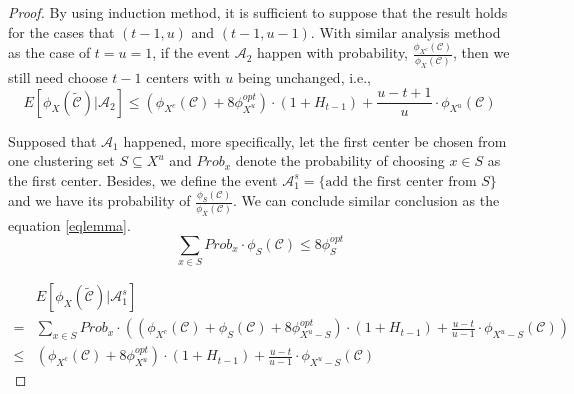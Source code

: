 \begin{lemma}
\begin{proof}
          
         By using induction method, it is sufficient to suppose that the result holds for the cases that $(t-1, u)$ and $(t-1, u-1)$. With similar analysis method as the case of $t = u =1$, if the event $\mathscr{A}_{2}$ happen with probability, $\frac{\phi_{X^{c}}(\mathcal{C})}{\phi_{X}(\mathcal{C})}$, then we still need choose $t-1$ centers with $u$ being unchanged, i.e., 
         \begin{equation}
         E[\phi_{X}(\tilde{\mathcal{C}})|\mathscr{A}_{2}] \leq \left(\phi_{X^{c}}(\mathcal{C}) + 8\phi^{opt}_{X^{u}}\right)\cdot (1+H_{t-1}) + \frac{u-t + 1}{u}\cdot \phi_{X^{u}}(\mathcal{C})
         \end{equation}
         
         Supposed that $\mathscr{A}_{1}$ happened, more specifically, let the first center be chosen from one clustering set $S \subseteq X^{u}$ and $Prob_{x}$ denote the probability of choosing $x \in S$ as the first center. Besides, we define the event $\mathscr{A}_{1}^{s} = \{\text{add the first center from $S$}\}$ and we have its probability of $\frac{\phi_{S}(\mathcal{C})}{\phi_{X}(\mathcal{C})}$. We can conclude similar conclusion as the equation \ref{eqlemma}.
         $$ \sum_{x \in S} Prob_{x} \cdot \phi_{S}(\mathcal{C}) \leq 8\phi^{opt}_{S} $$ 
         
          \begin{equation}
          \begin{aligned}
         &E[\phi_{X}(\tilde{\mathcal{C}})|\mathscr{A}_{1}^{s}] \\
         = & \sum_{x \in S} Prob_{x} \cdot \left( \left(\phi_{X^{c}}(\mathcal{C}) + \phi_{S}(\mathcal{C})
         + 8\phi^{opt}_{X^{u} - S}\right)\cdot (1+H_{t-1}) + \frac{u-t}{u-1}\cdot \phi_{X^{u}-S}(\mathcal{C})\right)\\
           \leq & \left(\phi_{X^{c}}(\mathcal{C})
         + 8\phi^{opt}_{X^{u} }\right)\cdot (1+H_{t-1}) + \frac{u-t}{u-1}\cdot \phi_{X^{u}-S}(\mathcal{C}) 
           \end{aligned}
         \end{equation}
         

\end{proof}
\end{lemma}
